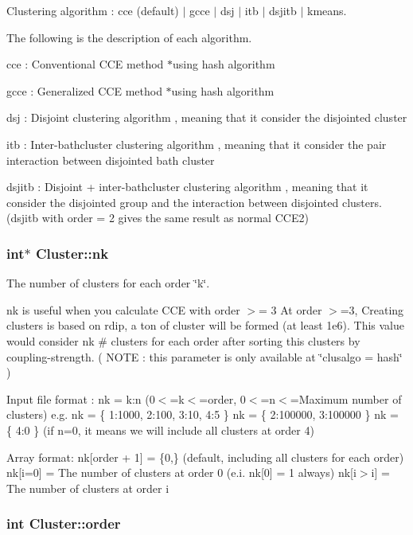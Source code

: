 Clustering algorithm \-: cce (default) $|$ gcce $|$ dsj $|$ itb $|$ dsjitb $|$ kmeans. 

The following is the description of each algorithm.


\begin{DoxyItemize}
\item cce \-: Conventional C\-C\-E method $\ast$using hash algorithm
\item gcce \-: Generalized C\-C\-E method $\ast$using hash algorithm
\item dsj \-: Disjoint clustering algorithm , meaning that it consider the disjointed cluster
\item itb \-: Inter-\/bathcluster clustering algorithm , meaning that it consider the pair interaction between disjointed bath cluster
\item dsjitb \-: Disjoint + inter-\/bathcluster clustering algorithm , meaning that it consider the disjointed group and the interaction between disjointed clusters. (dsjitb with order = 2 gives the same result as normal C\-C\-E2) 
\end{DoxyItemize}\hypertarget{structCluster_a1385a76b03a7f2f862526ff2bf449755}{
\subsubsection[{nk}]{\setlength{\rightskip}{0pt plus 5cm}int$\ast$ Cluster\-::nk}}\label{structCluster_a1385a76b03a7f2f862526ff2bf449755}


The number of clusters for each order \char`\"{}k\char`\"{}. 

nk is useful when you calculate C\-C\-E with order $>$= 3 At order $>$=3, Creating clusters is based on rdip, a ton of cluster will be formed (at least 1e6). This value would consider nk \# clusters for each order after sorting this clusters by coupling-\/strength. ( N\-O\-T\-E \-: this parameter is only available at \char`\"{}clusalgo = hash\char`\"{} )

Input file format \-: nk = k\-:n (0$<$=k$<$=order, 0$<$=n$<$=Maximum number of clusters) e.\-g. nk = \{ 1\-:1000, 2\-:100, 3\-:10, 4\-:5 \} nk = \{ 2\-:100000, 3\-:100000 \} nk = \{ 4\-:0 \} (if n=0, it means we will include all clusters at order 4)

Array format\-: nk\mbox{[}order + 1\mbox{]} = \{0,\} (default, including all clusters for each order) nk\mbox{[}i=0\mbox{]} = The number of clusters at order 0 (e.\-i. nk\mbox{[}0\mbox{]} = 1 always) nk\mbox{[}i$>$i\mbox{]} = The number of clusters at order i \hypertarget{structCluster_ae77394af156e2e278a34f12e83d66cb7}{
\subsubsection[{order}]{\setlength{\rightskip}{0pt plus 5cm}int Cluster\-::order}}\label{structCluster_ae77394af156e2e278a34f12e83d66cb7}


